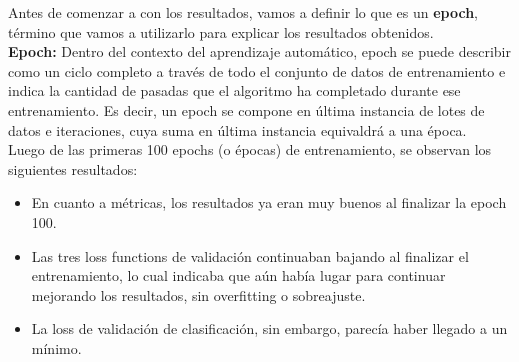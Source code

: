 Antes de comenzar a con los resultados, vamos a definir lo que es un \textbf{epoch}, término que vamos a utilizarlo para explicar los resultados obtenidos.\\

\textbf{Epoch:} Dentro del contexto del aprendizaje automático, epoch se puede describir como un ciclo completo a través de todo el conjunto de datos de entrenamiento e indica la cantidad de pasadas que el algoritmo ha completado durante ese entrenamiento. Es decir, un epoch se compone en última instancia de lotes de datos e iteraciones, cuya suma en última instancia equivaldrá a una época.
\\
Luego de las primeras 100 epochs (o épocas) de entrenamiento, se observan los siguientes resultados:
\begin{itemize}
    \item En cuanto a métricas, los resultados ya eran muy buenos al finalizar la epoch 100.
    \item Las tres loss functions de validación continuaban bajando al finalizar el entrenamiento, lo cual indicaba que aún había lugar para continuar mejorando los resultados, sin overfitting o sobreajuste.
    \item La loss de validación de clasificación, sin embargo, parecía haber llegado a un mínimo.
\end{itemize}

